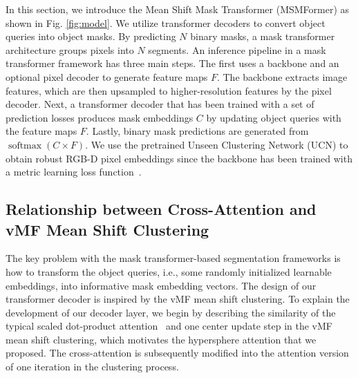\documentclass[letterpaper, 10 pt, conference]{ieeeconf}
\begin{document}
In this section, we introduce the Mean Shift Mask Transformer (MSMFormer) as shown in Fig. \ref{fig:model}.
We utilize transformer decoders to convert object queries into object masks. By predicting $N$ binary masks, a mask transformer architecture groups pixels into $N$ segments. An inference pipeline in a mask transformer framework has three main steps. The first uses a backbone and an optional pixel decoder to generate feature maps $F$. The backbone extracts image features, which are then upsampled to higher-resolution features by the pixel decoder. Next, a transformer decoder that has been trained with a set of prediction losses produces mask embeddings $C$ by updating object queries with the feature maps $F$. Lastly, binary mask predictions are generated from $\operatorname{softmax} (C \times F)$. We use the pretrained Unseen Clustering Network (UCN) \cite{xiang2020learning} to obtain robust RGB-D pixel embeddings since the backbone has been trained with a metric learning loss function~\cite{xiang2020learning, de2017semantic, xie2019object}.












\vspace{-2mm}
\subsection{Relationship between Cross-Attention and vMF Mean Shift Clustering}




The key problem with the mask transformer-based segmentation frameworks is how to transform the object queries, i.e., some randomly initialized learnable embeddings, into informative mask embedding vectors.  The design of our transformer decoder is inspired by the vMF mean shift clustering. To explain the development of our decoder layer, we begin by describing the similarity of the typical scaled dot-product attention~\cite{vaswani2017attention} and one center update step in the vMF mean shift clustering, which motivates the hypersphere attention that we proposed. The cross-attention is subsequently modified into the attention version of one iteration in the clustering process.
\end{document}
